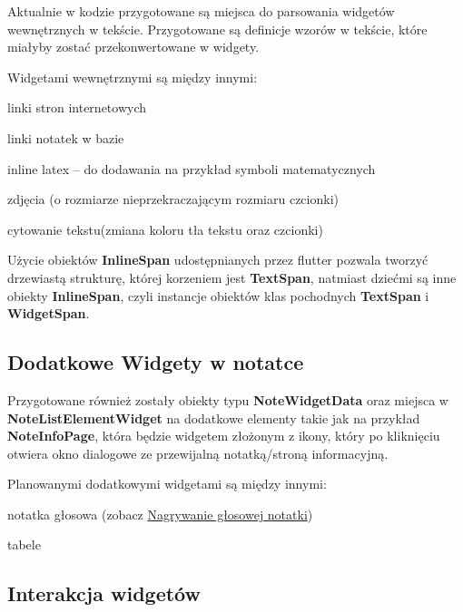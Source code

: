 Aktualnie w kodzie przygotowane są miejsca do parsowania widgetów wewnętrznych w tekście. Przygotowane są definicje wzorów w tekście, które miałyby zostać przekonwertowane w widgety.

Widgetami wewnętrznymi są między innymi:

\begin{compactitem}
    \item linki stron internetowych
    \item linki notatek w bazie
    \item inline latex -- do dodawania na przykład symboli matematycznych
    \item zdjęcia (o rozmiarze nieprzekraczającym rozmiaru czcionki)
    \item cytowanie tekstu(zmiana koloru tła tekstu oraz czcionki)
\end{compactitem}

Użycie obiektów \textbf{InlineSpan} udostępnianych przez flutter pozwala tworzyć drzewiastą strukturę, której korzeniem jest \textbf{TextSpan}, natmiast dziećmi są inne obiekty \textbf{InlineSpan}, czyli instancje obiektów klas pochodnych \textbf{TextSpan} i \textbf{WidgetSpan}.

\subsection{Dodatkowe Widgety w notatce}

Przygotowane również zostały obiekty typu \textbf{NoteWidgetData} oraz miejsca w \textbf{NoteListElementWidget} na dodatkowe elementy takie jak na przykład \textbf{NoteInfoPage}, która będzie widgetem złożonym z ikony, który po kliknięciu otwiera okno dialogowe ze przewijalną notatką/stroną informacyjną.

Planowanymi dodatkowymi widgetami są między innymi:

\begin{compactitem}
    \item notatka głosowa (zobacz \hyperlink{sec:glosowaNotatka}{Nagrywanie głosowej notatki})
    \item tabele
    
\end{compactitem}

\subsection{Interakcja widgetów}

